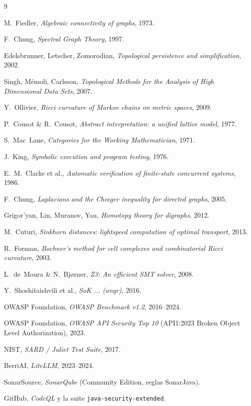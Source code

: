 \documentclass[11pt]{article}
\begin{document}
\begin{thebibliography}{9}
\item M.~Fiedler, \emph{Algebraic connectivity of graphs}, 1973.
\item F.~Chung, \emph{Spectral Graph Theory}, 1997.
\item Edelsbrunner, Letscher, Zomorodian, \emph{Topological persistence and simplification}, 2002.
\item Singh, M\'emoli, Carlsson, \emph{Topological Methods for the Analysis of High Dimensional Data Sets}, 2007.
\item Y.~Ollivier, \emph{Ricci curvature of Markov chains on metric spaces}, 2009.
\item P.~Cousot \& R.~Cousot, \emph{Abstract interpretation: a unified lattice model}, 1977.
\item S.~Mac~Lane, \emph{Categories for the Working Mathematician}, 1971.
\item J.~King, \emph{Symbolic execution and program testing}, 1976.
\item E.~M.~Clarke et al., \emph{Automatic verification of finite-state concurrent systems}, 1986.
\item F.~Chung, \emph{Laplacians and the Cheeger inequality for directed graphs}, 2005.
\item Grigor'yan, Lin, Muranov, Yau, \emph{Homotopy theory for digraphs}, 2012.
\item M.~Cuturi, \emph{Sinkhorn distances: lightspeed computation of optimal transport}, 2013.
\item R.~Forman, \emph{Bochner's method for cell complexes and combinatorial Ricci curvature}, 2003.
\item L.~de~Moura \& N.~Bj\o rner, \emph{Z3: An efficient SMT solver}, 2008.
\item Y.~Shoshitaishvili et al., \emph{SoK ... (angr)}, 2016.
\item OWASP Foundation, \emph{OWASP Benchmark v1.2}, 2016--2024.
\item OWASP Foundation, \emph{OWASP API Security Top 10} (API1:2023 Broken Object Level Authorization), 2023.
\item NIST, \emph{SARD / Juliet Test Suite}, 2017.
\item BerriAI, \emph{LiteLLM}, 2023--2024.
\item SonarSource, \emph{SonarQube} (Community Edition, reglas SonarJava).
\item GitHub, \emph{CodeQL} y la suite \texttt{java-security-extended}.
\end{thebibliography}
\end{document}
